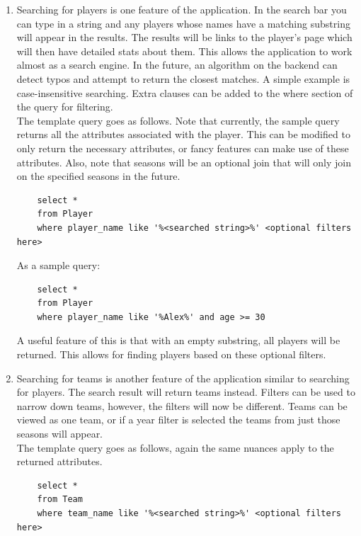 \documentclass[11pt]{article}
\begin{document}
\begin{enumerate}

\item Searching for players is one feature of the application. In the search bar you can type in a string and any players whose names have a matching substring will appear in the results. The results will be links to the player's page which will then have detailed stats about them. This allows the application to work almost as a search engine. In the future, an algorithm on the backend can detect typos and attempt to return the closest matches. A simple example is case-insensitive searching. Extra clauses can be added to the where section of the query for filtering. \\

The template query goes as follows. Note that currently, the sample query returns all the attributes associated with the player. This can be modified to only return the necessary attributes, or fancy features can make use of these attributes. Also, note that seasons will be an optional join that will only join on the specified seasons in the future.

\begin{verbatim}
    select *
    from Player
    where player_name like '%<searched string>%' <optional filters here>
\end{verbatim}

As a sample query:
\begin{verbatim}
    select *
    from Player
    where player_name like '%Alex%' and age >= 30
\end{verbatim}

A useful feature of this is that with an empty substring, all players will be returned. This allows for finding players based on these optional filters. \\


\item Searching for teams is another feature of the application similar to searching for players. The search result will return teams instead. Filters can be used to narrow down teams, however, the filters will now be different. Teams can be viewed as one team, or if a year filter is selected the teams from just those seasons will appear. \\

The template query goes as follows, again the same nuances apply to the returned attributes.
\begin{verbatim}
    select *
    from Team
    where team_name like '%<searched string>%' <optional filters here>
\end{verbatim}


\end{enumerate}
\end{document}

